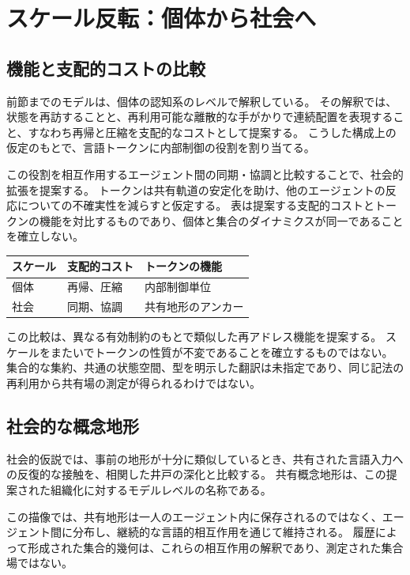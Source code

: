 \section{スケール反転：個体から社会へ}
\label{sec:multiscale}

\subsection{機能と支配的コストの比較}
前節までのモデルは、個体の認知系のレベルで解釈している。
その解釈では、状態を再訪することと、再利用可能な離散的な手がかりで連続配置を表現すること、すなわち再帰と圧縮を支配的なコストとして提案する。
こうした構成上の仮定のもとで、言語トークンに内部制御の役割を割り当てる。

この役割を相互作用するエージェント間の同期・協調と比較することで、社会的拡張を提案する。
トークンは共有軌道の安定化を助け、他のエージェントの反応についての不確実性を減らすと仮定する。
表は提案する支配的コストとトークンの機能を対比するものであり、個体と集合のダイナミクスが同一であることを確立しない。

\begin{center}
\begin{tabular}{lll}
\toprule
\textbf{スケール} & \textbf{支配的コスト} & \textbf{トークンの機能} \\
\midrule
個体 & 再帰、圧縮 & 内部制御単位 \\
社会 & 同期、協調 & 共有地形のアンカー \\
\bottomrule
\end{tabular}
\end{center}

この比較は、異なる有効制約のもとで類似した再アドレス機能を提案する。
スケールをまたいでトークンの性質が不変であることを確立するものではない。
集合的な集約、共通の状態空間、型を明示した翻訳は未指定であり、同じ記法の再利用から共有場の測定が得られるわけではない。

\subsection{社会的な概念地形}
社会的仮説では、事前の地形が十分に類似しているとき、共有された言語入力への反復的な接触を、相関した井戸の深化と比較する。
共有概念地形は、この提案された組織化に対するモデルレベルの名称である。

この描像では、共有地形は一人のエージェント内に保存されるのではなく、エージェント間に分布し、継続的な言語的相互作用を通じて維持される。
履歴によって形成された集合的幾何は、これらの相互作用の解釈であり、測定された集合場ではない。

